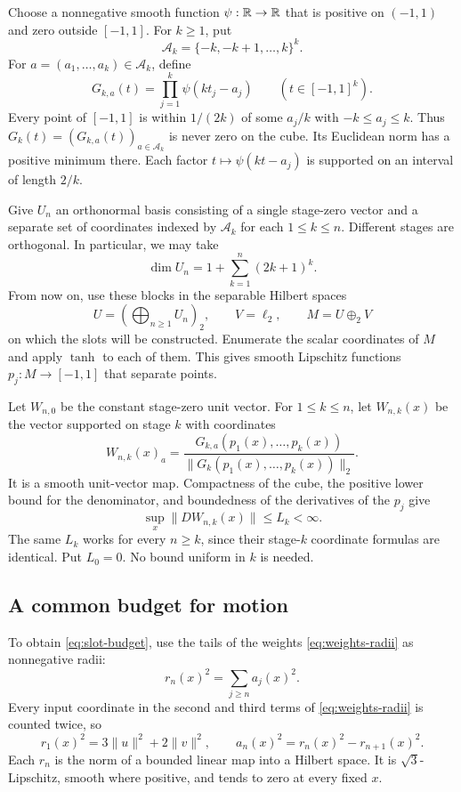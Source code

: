 Choose a nonnegative smooth function $\psi:\mathbb R\to\mathbb R$ that is
positive on $(-1,1)$ and zero outside $[-1,1]$. For $k\ge1$, put
\[
 \mathcal A_k=\{-k,-k+1,\ldots,k\}^k.
\]
For $a=(a_1,\ldots,a_k)\in\mathcal A_k$, define
\[
 G_{k,a}(t)=\prod_{j=1}^k\psi(kt_j-a_j)
 \qquad(t\in[-1,1]^k).
\]
Every point of $[-1,1]$ is within $1/(2k)$ of some $a_j/k$ with
$-k\le a_j\le k$. Thus $G_k(t)=(G_{k,a}(t))_{a\in\mathcal A_k}$
is never zero on the cube. Its Euclidean norm has a positive minimum
there. Each factor $t\mapsto\psi(kt-a_j)$ is supported on an interval
of length $2/k$.

Give $U_n$ an orthonormal basis consisting of a single stage-zero
vector and a separate set of coordinates indexed by $\mathcal A_k$
for each $1\le k\le n$. Different stages are orthogonal. In
particular, we may take
\begin{equation}
\label{eq:block-dimensions}
 \dim U_n=1+\sum_{k=1}^n(2k+1)^k.
\end{equation}
From now on, use these blocks in the separable Hilbert spaces
\[
 U=\left(\bigoplus_{n\ge1}U_n\right)_2,
 \qquad V=\ell_2,\qquad M=U\oplus_2V
\]
on which the slots will be constructed. Enumerate the scalar
coordinates of $M$ and apply $\tanh$ to each of them. This gives
smooth Lipschitz functions $p_j:M\to[-1,1]$ that separate points.

Let $W_{n,0}$ be the constant stage-zero unit vector. For $1\le k\le n$,
let $W_{n,k}(x)$ be the vector supported on stage $k$ with coordinates
\begin{equation}
\label{eq:normalized-stage}
 W_{n,k}(x)_a
 =\frac{G_{k,a}(p_1(x),\ldots,p_k(x))}
        {\|G_k(p_1(x),\ldots,p_k(x))\|_2}.
\end{equation}
It is a smooth unit-vector map. Compactness of the cube, the positive
lower bound for the denominator, and boundedness of the derivatives
of the $p_j$ give
\[
 \sup_x\|DW_{n,k}(x)\|\le L_k<\infty.
\]
The same $L_k$ works for every $n\ge k$, since their stage-$k$
coordinate formulas are identical. Put $L_0=0$. No bound uniform in
$k$ is needed.

\subsection{A common budget for motion}

To obtain \eqref{eq:slot-budget}, use the tails of the weights
\eqref{eq:weights-radii} as nonnegative radii:
\[
 r_n(x)^2=\sum_{j\ge n}a_j(x)^2.
\]
Every input coordinate in the second and third terms of
\eqref{eq:weights-radii} is counted twice, so
\begin{equation}
\label{eq:radii-identities}
 r_1(x)^2=3\|u\|^2+2\|v\|^2,
 \qquad a_n(x)^2=r_n(x)^2-r_{n+1}(x)^2.
\end{equation}
Each $r_n$ is the norm of a bounded linear map into a Hilbert space.
It is $\sqrt3$-Lipschitz, smooth where positive, and tends to zero
at every fixed $x$.

